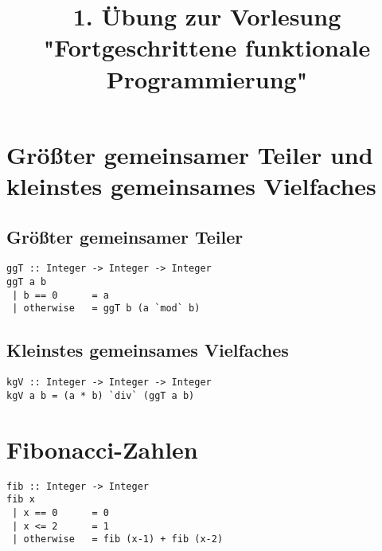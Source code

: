 \documentclass[a4paper]{article}
\title{1. Übung zur Vorlesung "Fortgeschrittene funktionale Programmierung"}
\begin{document}
\maketitle

\setcounter{section}{1}
\section{Größter gemeinsamer Teiler und kleinstes gemeinsames Vielfaches}

\subsection*{Größter gemeinsamer Teiler}

\begin{lstlisting}
ggT :: Integer -> Integer -> Integer
ggT a b
 | b == 0      = a
 | otherwise   = ggT b (a `mod` b)
\end{lstlisting}

\subsection*{Kleinstes gemeinsames Vielfaches}

\begin{lstlisting}
kgV :: Integer -> Integer -> Integer
kgV a b = (a * b) `div` (ggT a b)
\end{lstlisting}

\section{Fibonacci-Zahlen}

\begin{lstlisting}
fib :: Integer -> Integer
fib x
 | x == 0      = 0
 | x <= 2      = 1
 | otherwise   = fib (x-1) + fib (x-2)
\end{lstlisting}
\end{document}
